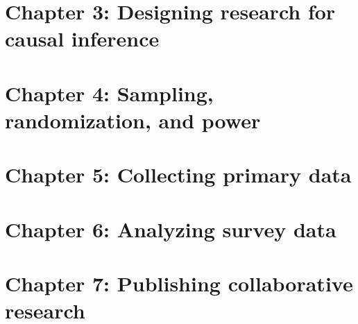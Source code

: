 \chapter{Chapter 3: Designing research for causal inference}
\label{ch:3}




\chapter{Chapter 4: Sampling, randomization, and power}
\label{ch:4}




\chapter{Chapter 5: Collecting primary data}
\label{ch:5}




\chapter{Chapter 6: Analyzing survey data}
\label{ch:6}




\chapter{Chapter 7: Publishing collaborative research}
\label{ch:7}



